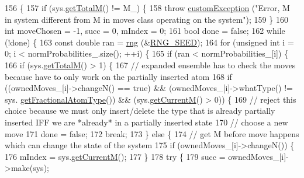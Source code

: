 \begin{DoxyCode}
156                                     \{
157     \textcolor{keywordflow}{if} (sys.\hyperlink{classsim_system_aa4ad1afff101bb530e1590df05035276}{getTotalM}() != M\_) \{
158         \textcolor{keywordflow}{throw} \hyperlink{classcustom_exception}{customException} (\textcolor{stringliteral}{"Error, M in system different from M in moves class operating
       on the system"});
159     \}
160     \textcolor{keywordtype}{int} moveChosen = -1, succ = 0, mIndex = 0;
161     \textcolor{keywordtype}{bool} done = \textcolor{keyword}{false};
162     \textcolor{keywordflow}{while} (!done) \{
163         \textcolor{keyword}{const} \textcolor{keywordtype}{double} ran = \hyperlink{utilities_8cpp_a0f9542af4b475ac79cb679d7a8d14db0}{rng} (&\hyperlink{global_8h_a3f4e4ea24d5a5c66feae55d1f329c884}{RNG\_SEED});
164         \textcolor{keywordflow}{for} (\textcolor{keywordtype}{unsigned} \textcolor{keywordtype}{int} i = 0; i < normProbabilities\_.size(); ++i) \{
165             \textcolor{keywordflow}{if} (ran < normProbabilities\_[i]) \{
166                 \textcolor{keywordflow}{if} (sys.\hyperlink{classsim_system_aa4ad1afff101bb530e1590df05035276}{getTotalM}() > 1) \{
167                     \textcolor{comment}{// expanded ensemble has to check the moves because have to only work on the partially
       inserted atom}
168                     \textcolor{keywordflow}{if} ((ownedMoves\_[i]->changeN() == \textcolor{keyword}{true}) && (ownedMoves\_[i]->whatType() != sys.
      \hyperlink{classsim_system_a0500a9e84eecfbde7a98cf8a34f719d5}{getFractionalAtomType}()) && (sys.\hyperlink{classsim_system_a299fe4372e610b554eaaf5f5957b2dbc}{getCurrentM}() > 0)) \{
169                         \textcolor{comment}{// reject this choice because we must only insert/delete the type that is already
       partially inserted IFF we are *already* in a partially inserted state}
170                         \textcolor{comment}{// choose a new move}
171                         done = \textcolor{keyword}{false};
172                         \textcolor{keywordflow}{break};
173                     \} \textcolor{keywordflow}{else} \{
174                         \textcolor{comment}{// get M before move happens which can change the state of the system}
175                         \textcolor{keywordflow}{if} (ownedMoves\_[i]->changeN()) \{
176                             mIndex = sys.\hyperlink{classsim_system_a299fe4372e610b554eaaf5f5957b2dbc}{getCurrentM}();
177                         \}
178                         \textcolor{keywordflow}{try} \{
179                             succ = ownedMoves\_[i]->make(sys);

\end{DoxyCode}
